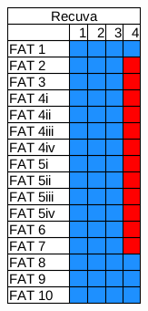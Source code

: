 \begin{figure}[h!]
\begin{subfigure}{0.17\linewidth}
    \end{subfigure}~~
    \begin{subfigure}{0.17\linewidth}
        \includegraphics[width=\linewidth]{fig/recuva_results_fat.png}

\end{subfigure}
\end{figure}
